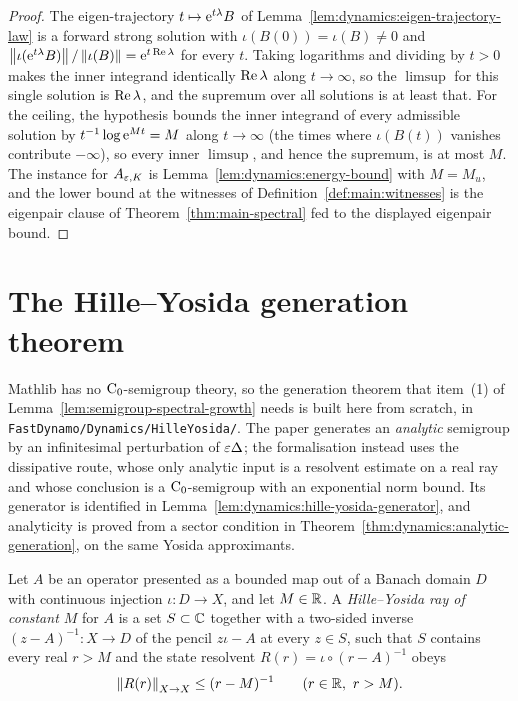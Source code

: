 \begin{proof}
  \leanok
  The eigen-trajectory $t\mapsto\mathrm{e}^{t\lambda}B $ of
  Lemma~\ref{lem:dynamics:eigen-trajectory-law} is a forward strong solution with
  $\iota(B(0))=\iota(B)\neq0 $ and
  $\left\|\iota(\mathrm{e}^{t\lambda}B)\right\|/\left\|\iota(B)\right\|=\mathrm{e}^{t\operatorname{Re}\lambda} $ for every $t $.  Taking
  logarithms and dividing by $t>0 $ makes the inner integrand identically $\operatorname{Re}\lambda $
  along $t\to\infty $, so the $\limsup $ for this single solution is $\operatorname{Re}\lambda $, and the
  supremum over all solutions is at least that.  For the ceiling, the hypothesis bounds
  the inner integrand of every admissible solution by $t^{-1}\log\mathrm{e}^{Mt}=M $ along
  $t\to\infty $ (the times where $\iota(B(t)) $ vanishes contribute $-\infty $), so every
  inner $\limsup $, and hence the supremum, is at most $M $.  The instance for
  $A_{\varepsilon,K} $ is Lemma~\ref{lem:dynamics:energy-bound} with $M=M_u $, and the lower
  bound at the witnesses of Definition~\ref{def:main:witnesses} is the eigenpair clause of
  Theorem~\ref{thm:main-spectral} fed to the displayed eigenpair bound.
\end{proof}

\section{The Hille--Yosida generation theorem}
\label{sec:dynamics:hille-yosida}

Mathlib has no $\mathrm{C}_0 $-semigroup theory, so the generation theorem that item~(1) of
Lemma~\ref{lem:semigroup-spectral-growth} needs is built here from scratch, in
\texttt{FastDynamo/Dynamics/HilleYosida/}.  The paper generates an \emph{analytic}
semigroup by an infinitesimal perturbation of $\varepsilon\Delta $; the formalisation instead uses
the dissipative route, whose only analytic input is a resolvent estimate on a real ray and
whose conclusion is a $\mathrm{C}_0 $-semigroup with an exponential norm bound.  Its generator is
identified in Lemma~\ref{lem:dynamics:hille-yosida-generator}, and analyticity is proved from a
sector condition in Theorem~\ref{thm:dynamics:analytic-generation}, on the same Yosida
approximants.

\begin{definition}
  \label{def:dynamics:hille-yosida-ray}
  \leanok
  Let $A $ be an operator presented as a bounded map out of a Banach domain $D $ with
  continuous injection $\iota:D\to X $, and let $M\in\mathbb{R} $.  A \emph{Hille--Yosida ray of
  constant $M $} for $A $ is a set $S\subset\mathbb{C} $ together with a two-sided inverse
  $(z-A)^{-1}:X\to D $ of the pencil $z\iota-A $ at every $z\in S $, such that $S $ contains
  every real $r>M $ and the state resolvent $R(r)=\iota\circ(r-A)^{-1} $ obeys
  \[
    \left\|R(r)\right\|_{X\to X}\leq(r-M)^{-1}
    \qquad(r\in\mathbb{R},\ r>M).
  \]
\end{definition}

